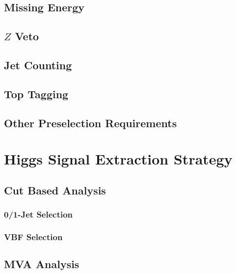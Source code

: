 \documentclass{cmspaper}
\begin{document}
   \subsection{Missing Energy} 
     \label{sec:sel_met}
     
   \subsection{$Z$ Veto}
     \label{sec:sel_zveto}
     
   \subsection{Jet Counting} 
     \label{sec:sel_jets}
     
  \subsection{Top Tagging}
     \label{sec:sel_toptag}
     
   \subsection{Other Preselection Requirements}
     \label{sec:sel_other}
     

\section{Higgs Signal Extraction Strategy}
   
   \label{sec:signal_selection}
   \subsection{Cut Based Analysis}
     \label{sec:anal_cutbased}
    \subsubsection{0/1-Jet Selection}
      \label{sec:sel_zerojet}
      
     \subsubsection{VBF Selection}
       \label{sec:sel_vbf}
       
   \subsection{MVA Analysis}
     \label{sec:anal_mva}
     
%       	
\end{document}
